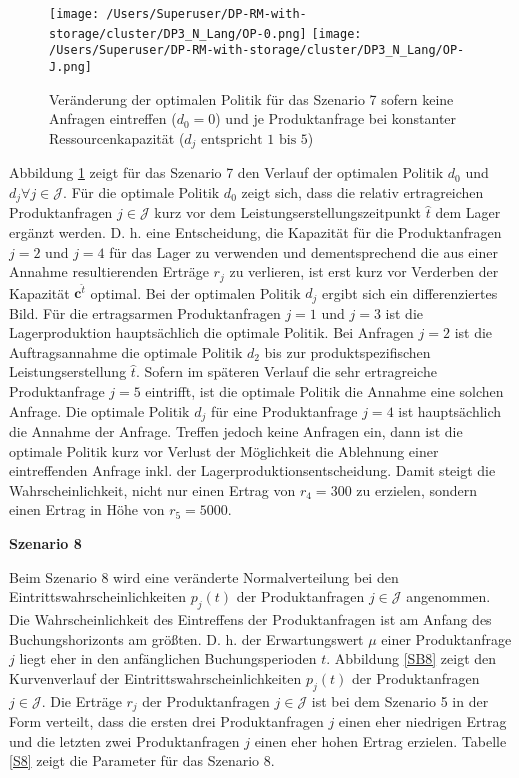\begin{figure}[h!]     
\begin{center}
\texttt{[image: /Users/Superuser/DP-RM-with-storage/cluster/DP3\_N\_Lang/OP-0.png]}
\texttt{[image: /Users/Superuser/DP-RM-with-storage/cluster/DP3\_N\_Lang/OP-J.png]}
    \caption{Veränderung der optimalen Politik für das Szenario 7 sofern keine Anfragen eintreffen ($d_0=0$) und je Produktanfrage bei konstanter Ressourcenkapazität ($d_j\text{ entspricht }1\text{ bis }5$)}  \label{SV7}
  \end{center}
\end{figure}

Abbildung \ref{SV7} zeigt für das Szenario 7 den Verlauf der optimalen Politik $d_0$ und $d_j\forall j\in\mathcal{J}$. Für die optimale Politik $d_0$ zeigt sich, dass die relativ ertragreichen Produktanfragen $j\in\mathcal{J}$ kurz vor dem Leistungserstellungszeitpunkt $\hat t$ dem Lager ergänzt werden. D. h. eine Entscheidung, die Kapazität für die Produktanfragen $j=2$ und $j=4$ für das Lager zu verwenden und dementsprechend die aus einer Annahme resultierenden Erträge $r_j$ zu verlieren, ist erst kurz vor Verderben der Kapazität $\textbf{c}^{\hat t}$ optimal. Bei der optimalen Politik $d_j$ ergibt sich ein differenziertes Bild. Für die ertragsarmen Produktanfragen $j=1$ und $j=3$ ist die Lagerproduktion hauptsächlich die optimale Politik. Bei Anfragen $j=2$ ist die Auftragsannahme die optimale Politik $d_2$ bis zur produktspezifischen Leistungserstellung $\hat t$. Sofern im späteren Verlauf die sehr ertragreiche Produktanfrage $j=5$ eintrifft, ist die optimale Politik die Annahme eine solchen Anfrage. Die optimale Politik $d_j$ für eine Produktanfrage $j=4$ ist hauptsächlich die Annahme der Anfrage. Treffen jedoch keine Anfragen ein, dann ist die optimale Politik kurz vor Verlust der Möglichkeit die Ablehnung einer eintreffenden Anfrage inkl. der Lagerproduktionsentscheidung. Damit steigt die Wahrscheinlichkeit, nicht nur einen Ertrag von $r_4=300$ zu erzielen, sondern einen Ertrag in Höhe von $r_5=5000$.

\textbf{Szenario 8}

Beim Szenario 8 wird eine veränderte Normalverteilung bei den Eintrittswahrscheinlichkeiten $p_j(t)$ der Produktanfragen $j\in\mathcal{J}$ angenommen. Die Wahrscheinlichkeit des Eintreffens der Produktanfragen ist am Anfang des Buchungshorizonts am größten. D. h. der Erwartungswert $\mu$ einer Produktanfrage $j$ liegt eher in den anfänglichen Buchungsperioden $t$. Abbildung \ref{SB8} zeigt den Kurvenverlauf der Eintrittswahrscheinlichkeiten $p_j(t)$ der Produktanfragen $j\in\mathcal{J}$. Die Erträge $r_j$ der Produktanfragen $j\in\mathcal{J}$ ist bei dem Szenario 5 in der Form verteilt, dass die ersten drei Produktanfragen $j$ einen eher niedrigen Ertrag und die letzten zwei Produktanfragen $j$ einen eher hohen Ertrag erzielen. Tabelle \ref{S8} zeigt die Parameter für das Szenario 8.

